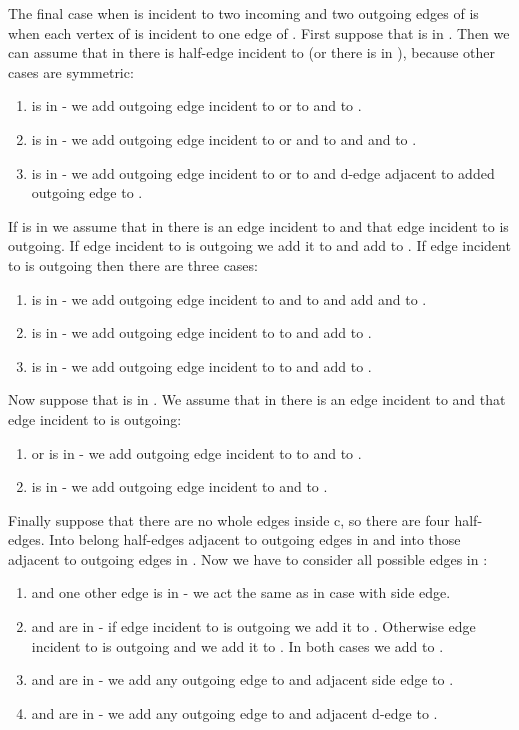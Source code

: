\documentclass[a4, 11pt]{article}
\newcommand{\<}{\langle}
\renewcommand{\>}{\rangle}
\begin{document}
The final case when  is incident to two incoming and two outgoing edges of  is when each vertex of  is incident to one edge of . First suppose that  is in . Then we can assume that in  there is half-edge incident to  (or there is  in ), because other cases are symmetric:
\begin{enumerate}
	\item  is in  - we add outgoing edge incident to  or  to  and  to .
	\item  is in  - we add outgoing edge incident to  or  and  to  and  and  to .
	\item  is in  - we add outgoing edge incident to  or  to  and d-edge adjacent to added outgoing edge to .
\end{enumerate}
If  is in  we assume that in  there is an edge incident to  and that edge incident to  is outgoing. If edge incident to  is outgoing we add it to  and add  to . If edge incident to  is outgoing then there are three cases:
\begin{enumerate}
	\item  is in  - we add outgoing edge incident to  and  to  and add  and  to .
	\item  is in  - we add outgoing edge incident to  to  and add  to .
	\item  is in  - we add outgoing edge incident to  to  and add  to .
\end{enumerate} 
Now suppose that  is in . We assume that in  there is an edge incident to  and that edge incident to  is outgoing:
\begin{enumerate}
	\item  or  is in  - we add outgoing edge incident to  to  and  to .
	\item  is in  - we add outgoing edge incident  to  and  to .
\end{enumerate}

Finally suppose that there are no whole edges inside c, so there are four half-edges. Into  belong half-edges adjacent to outgoing edges in  and into  those adjacent to outgoing edges in . Now we have to consider all possible edges in :
\begin{enumerate}
	\item  and one other edge is in  - we act the same as in case with side edge.
	\item  and  are in  - if edge incident to  is outgoing we add it to . Otherwise edge incident to  is outgoing and we add it to . In both cases we add  to .
	\item  and  are in  - we add any outgoing edge to  and adjacent side edge to .
	\item  and  are in  - we add any outgoing edge to  and adjacent d-edge to .
\end{enumerate}
\end{document}
